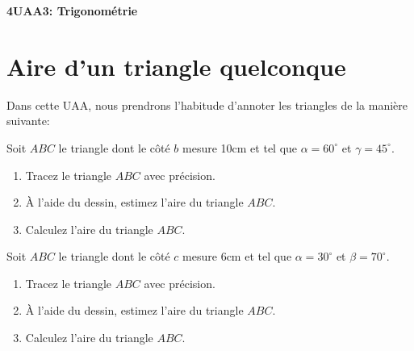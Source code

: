 \documentclass[
  a4paper,
  oneside]{book}
\author{}
\date{}
\providecommand{\tightlist}{%
  \setlength{\itemsep}{0pt}\setlength{\parskip}{0pt}}\usepackage{longtable,booktabs,array}
\begin{document}
\frontmatter


\mainmatter
\begin{titlepage}

\begin{center}

\vspace{2cm}
\Huge

\textbf{4UAA3: Trigonométrie} \vspace{4cm}



\end{center}

\end{titlepage}
\tableofcontents
\chapter{Aire d'un triangle
quelconque}\label{aire-dun-triangle-quelconque}

Dans cette UAA, nous prendrons l'habitude d'annoter les triangles de la
manière suivante:

\begin{exercice}

Soit \(ABC\) le triangle dont le côté \(b\) mesure 10cm et tel que
\(\alpha=60^\circ\) et \(\gamma=45^\circ\).

\begin{enumerate}
\def\labelenumi{\arabic{enumi}.}
\tightlist
\item
  Tracez le triangle \(ABC\) avec précision.
\item
  À l'aide du dessin, estimez l'aire du triangle \(ABC\).
\item
  Calculez l'aire du triangle \(ABC\).
\end{enumerate}

\end{exercice}

\begin{exercice}

Soit \(ABC\) le triangle dont le côté \(c\) mesure 6cm et tel que
\(\alpha=30^\circ\) et \(\beta=70^\circ\).

\begin{enumerate}
\def\labelenumi{\arabic{enumi}.}
\tightlist
\item
  Tracez le triangle \(ABC\) avec précision.
\item
  À l'aide du dessin, estimez l'aire du triangle \(ABC\).
\item
  Calculez l'aire du triangle \(ABC\).
\end{enumerate}

\end{exercice}
\end{document}
